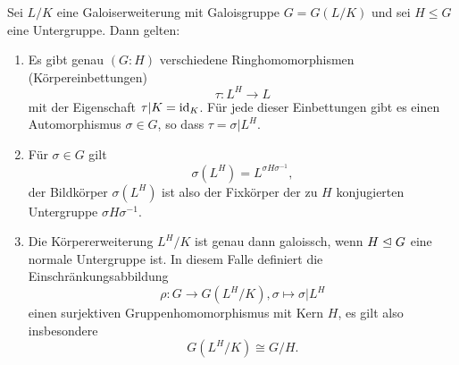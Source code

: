 \documentclass{book}
\begin{document}
\begin{thm}
    \label{thm:galoisnormal}
    Sei $L/K$ eine Galoiserweiterung mit Galoisgruppe $G=G(L/K)$ und sei $H \le
    G$ eine Untergruppe. Dann gelten:
    \begin{enumerate}
        \item Es gibt genau $(G:H)$ verschiedene Ringhomomorphismen (Körpereinbettungen) 
            \[
                \tau: L^H \to L
            \]
            mit der Eigenschaft $\tau|K = \operatorname{id}_K$. Für jede dieser Einbettungen
            gibt es einen Automorphismus $\sigma \in G$, so dass $\tau = \sigma|L^H$. 
        \item Für $\sigma \in G$ gilt
            \[
                \sigma(L^H) = L^{\sigma H \sigma^{-1}}, 
            \]
            der Bildkörper $\sigma(L^H)$ ist also der Fixkörper der zu $H$
            konjugierten Untergruppe $\sigma H \sigma^{-1}$. 
        \item Die Körpererweiterung $L^H/K$ ist genau dann galoissch, wenn $H
            \trianglelefteq G$ eine normale Untergruppe ist. In diesem Falle definiert die
            Einschränkungsabbildung
            \[
                \rho: G \to G(L^H/K), \sigma \mapsto \sigma|L^H
            \]
            einen surjektiven Gruppenhomomorphismus mit Kern $H$, es gilt also insbesondere
            \[
                G(L^H/K) \cong G/H.
            \]
    \end{enumerate}
\end{thm}
\end{document}
